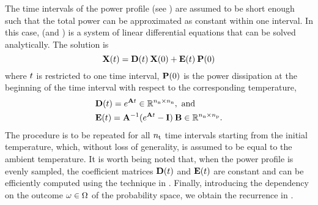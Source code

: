 The time intervals of the power profile (see ) are assumed to be short enough such that the total power can be approximated as constant within one interval.
In this case,  (and ) is a system of linear differential equations that can be solved analytically.
The solution is \cite{ukhov2012}
\begin{equation} \elabel{ode-solution}
  \vX(\t) = \mCF(\t) \: \vX(0) + \mCS(\t) \: \vP(0)
\end{equation}
where $t$ is restricted to one time interval, $\mathbf{P}(0)$ is the power dissipation at the beginning of the time interval with respect to the corresponding temperature,
\begin{align*}
  & \mCF(\t) = e^{\mA \t} \in \real^{\nnodes \times \nnodes}, \text{ and} \\
  & \mCS(\t) = \mA^{-1} (e^{\mA \t} - \mI) \: \mB \in \real^{\nnodes \times \nprocs}.
\end{align*}
The procedure is to be repeated for all ${n_\text{t}}$ time intervals starting from the initial temperature, which, without loss of generality, is assumed to be equal to the ambient temperature.
It is worth being noted that, when the power profile is evenly sampled, the coefficient matrices $\mCF(\t)$ and $\mCS(\t)$ are constant and can be efficiently computed using the technique in \cite{ukhov2012}.
Finally, introducing the dependency on the outcome $\omega \in \Omega$ of the probability space, we obtain the recurrence in .

